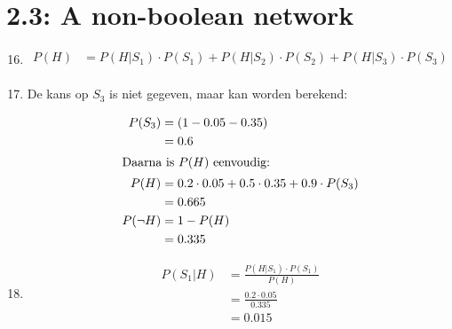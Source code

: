 \documentclass[a4paper,10pt,fleqn]{article}
\begin{document}
\section*{2.3: A non-boolean network}
\begin{enumerate}[1.]
    \setcounter{enumi}{15}
    \item
        \begin{align*}
            P(H) &= P(H|S_1) \cdot P(S_1) + P(H|S_2) \cdot P(S_2) + P(H|S_3) \cdot  P(S_3) \\
        \end{align*}

    \item De kans op $S_3$ is niet gegeven, maar kan worden berekend:


        \begin{align*}
          P(S_3)    & = (1 - 0.05 - 0.35)\\
                    & = 0.6 \\
          \intertext{Daarna is $P(H)$ eenvoudig:}
          P(H)      & = 0.2 \cdot 0.05 + 0.5 \cdot 0.35 + 0.9 \cdot P(S_3) \\
                    & = 0.665 \\
          P(\neg H) & = 1 - P(H)\\
                    & = 0.335 \\
        \end{align*}

    \item
        \begin{align*}
            P(S_1 | H)  & = \frac{P(H|S_1) \cdot P(S_1)}{P(H)} \\
                        & = \frac{0.2 \cdot 0.05}{0.335} \\
                        & = 0.015\\
        \end{align*}


\end{enumerate}
\end{document}
